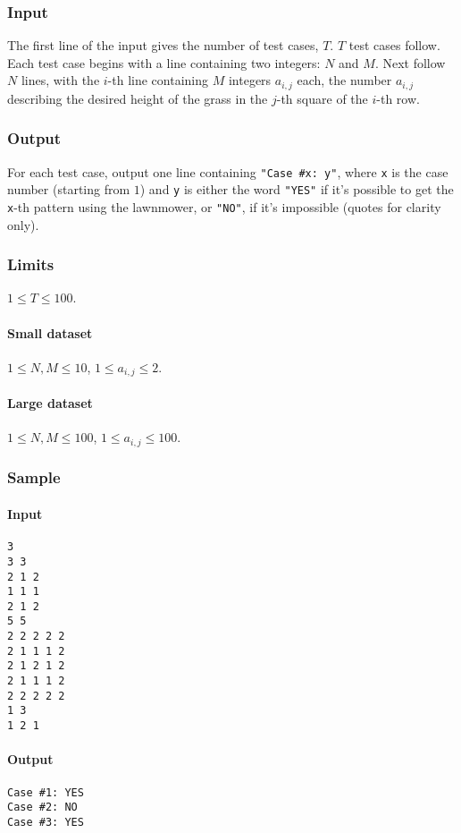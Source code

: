 \documentclass[titlepage]{article}
\begin{document}
\subsubsection{Input}
The first line of the input gives the number of test cases, $T$. $T$ test cases follow. Each test case begins with a line containing two integers: $N$ and $M$. Next follow $N$ lines, with the $i$-th line containing $M$ integers $a_{i,j}$ each, the number $a_{i,j}$ describing the desired height of the grass in the $j$-th square of the $i$-th row.

\subsubsection{Output}
For each test case, output one line containing \verb+"Case #x: y"+, where \verb+x+ is the case number (starting from $1$) and \verb+y+ is either the word \verb+"YES"+ if it's possible to get the \verb+x+-th pattern using the lawnmower, or \verb+"NO"+, if it's impossible (quotes for clarity only).

\subsubsection{Limits}
$1\leq T\leq100$.
\paragraph{Small dataset}
$1\leq N,M\leq10$, $1\leq a_{i,j}\leq2$.
\paragraph{Large dataset}
$1\leq N,M\leq100$, $1\leq a_{i,j}\leq100$.

\subsubsection{Sample}
\paragraph{Input}
\begin{verbatim}
3
3 3
2 1 2
1 1 1
2 1 2
5 5
2 2 2 2 2
2 1 1 1 2
2 1 2 1 2
2 1 1 1 2
2 2 2 2 2
1 3
1 2 1
\end{verbatim}

\paragraph{Output}
\begin{verbatim}
Case #1: YES
Case #2: NO
Case #3: YES
\end{verbatim}
\end{document}
